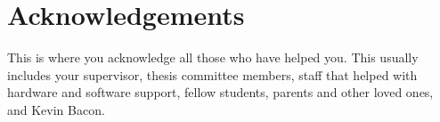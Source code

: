 \thispagestyle{empty}
\section*{Acknowledgements}

This is where you acknowledge all those who have helped you.
This usually includes your supervisor, thesis committee members,
staff that helped with hardware and software support,
fellow students, parents and other loved ones,
and Kevin Bacon.
